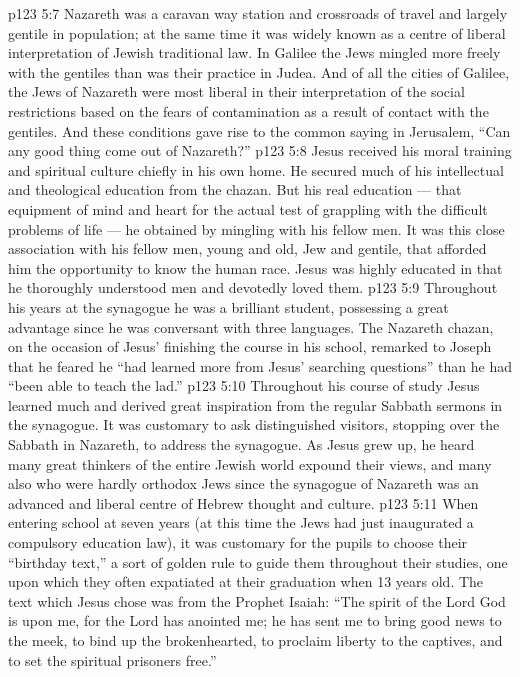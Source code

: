 \vs p123 5:7 Nazareth was a caravan way station and crossroads of travel and largely gentile in population; at the same time it was widely known as a centre of liberal interpretation of Jewish traditional law. In Galilee the Jews mingled more freely with the gentiles than was their practice in Judea. And of all the cities of Galilee, the Jews of Nazareth were most liberal in their interpretation of the social restrictions based on the fears of contamination as a result of contact with the gentiles. And these conditions gave rise to the common saying in Jerusalem, “Can any good thing come out of Nazareth?”
\vs p123 5:8 Jesus received his moral training and spiritual culture chiefly in his own home. He secured much of his intellectual and theological education from the chazan. But his real education --- that equipment of mind and heart for the actual test of grappling with the difficult problems of life --- he obtained by mingling with his fellow men. It was this close association with his fellow men, young and old, Jew and gentile, that afforded him the opportunity to know the human race. Jesus was highly educated in that he thoroughly understood men and devotedly loved them.
\vs p123 5:9 \pc Throughout his years at the synagogue he was a brilliant student, possessing a great advantage since he was conversant with three languages. The Nazareth chazan, on the occasion of Jesus’ finishing the course in his school, remarked to Joseph that he feared he “had learned more from Jesus’ searching questions” than he had “been able to teach the lad.”
\vs p123 5:10 Throughout his course of study Jesus learned much and derived great inspiration from the regular Sabbath sermons in the synagogue. It was customary to ask distinguished visitors, stopping over the Sabbath in Nazareth, to address the synagogue. As Jesus grew up, he heard many great thinkers of the entire Jewish world expound their views, and many also who were hardly orthodox Jews since the synagogue of Nazareth was an advanced and liberal centre of Hebrew thought and culture.
\vs p123 5:11 When entering school at seven years (at this time the Jews had just inaugurated a compulsory education law), it was customary for the pupils to choose their “birthday text,” a sort of golden rule to guide them throughout their studies, one upon which they often expatiated at their graduation when 13 years old. The text which Jesus chose was from the Prophet Isaiah: “The spirit of the Lord God is upon me, for the Lord has anointed me; he has sent me to bring good news to the meek, to bind up the brokenhearted, to proclaim liberty to the captives, and to set the spiritual prisoners free.”
